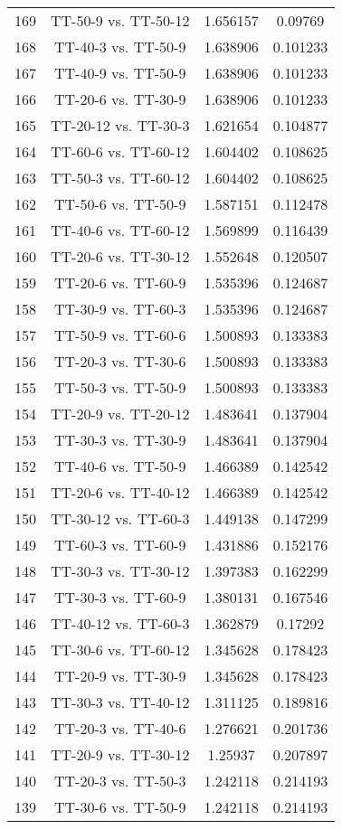 \documentclass[a4paper,10pt]{article}
\begin{document}
\begin{landscape}
\begin{table}[!htp]
\begin{tabular}{cccc}
169&TT-50-9 vs. TT-50-12&1.656157&0.09769\\
168&TT-40-3 vs. TT-50-9&1.638906&0.101233\\
167&TT-40-9 vs. TT-50-9&1.638906&0.101233\\
166&TT-20-6 vs. TT-30-9&1.638906&0.101233\\
165&TT-20-12 vs. TT-30-3&1.621654&0.104877\\
164&TT-60-6 vs. TT-60-12&1.604402&0.108625\\
163&TT-50-3 vs. TT-60-12&1.604402&0.108625\\
162&TT-50-6 vs. TT-50-9&1.587151&0.112478\\
161&TT-40-6 vs. TT-60-12&1.569899&0.116439\\
160&TT-20-6 vs. TT-30-12&1.552648&0.120507\\
159&TT-20-6 vs. TT-60-9&1.535396&0.124687\\
158&TT-30-9 vs. TT-60-3&1.535396&0.124687\\
157&TT-50-9 vs. TT-60-6&1.500893&0.133383\\
156&TT-20-3 vs. TT-30-6&1.500893&0.133383\\
155&TT-50-3 vs. TT-50-9&1.500893&0.133383\\
154&TT-20-9 vs. TT-20-12&1.483641&0.137904\\
153&TT-30-3 vs. TT-30-9&1.483641&0.137904\\
152&TT-40-6 vs. TT-50-9&1.466389&0.142542\\
151&TT-20-6 vs. TT-40-12&1.466389&0.142542\\
150&TT-30-12 vs. TT-60-3&1.449138&0.147299\\
149&TT-60-3 vs. TT-60-9&1.431886&0.152176\\
148&TT-30-3 vs. TT-30-12&1.397383&0.162299\\
147&TT-30-3 vs. TT-60-9&1.380131&0.167546\\
146&TT-40-12 vs. TT-60-3&1.362879&0.17292\\
145&TT-30-6 vs. TT-60-12&1.345628&0.178423\\
144&TT-20-9 vs. TT-30-9&1.345628&0.178423\\
143&TT-30-3 vs. TT-40-12&1.311125&0.189816\\
142&TT-20-3 vs. TT-40-6&1.276621&0.201736\\
141&TT-20-9 vs. TT-30-12&1.25937&0.207897\\
140&TT-20-3 vs. TT-50-3&1.242118&0.214193\\
139&TT-30-6 vs. TT-50-9&1.242118&0.214193\\

\end{tabular}
\end{table}
\end{landscape}
\end{document}
